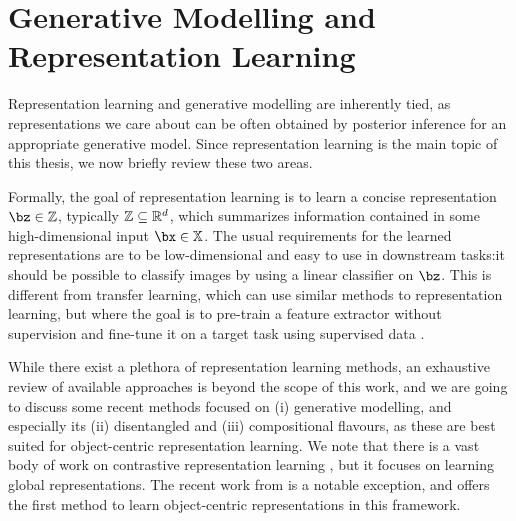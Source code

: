 \section{Generative Modelling and Representation Learning}
\label{sec:repr_learning}

Representation learning and generative modelling are inherently tied, as representations we care about can be often obtained by posterior inference for an appropriate generative model. 
Since representation learning is the main topic of this thesis, we now briefly review these two areas.

Formally, the goal of representation learning is to learn a concise representation $\bz \in \mathbb{Z}$, typically $\mathbb{Z} \subseteq \mathbb{R}^d$, which summarizes information contained in some high-dimensional input $\bx \in \mathbb{X}$.
The usual requirements for the learned representations are to be low-dimensional and easy to use in downstream tasks:\eg it should be possible to classify images by using a linear classifier on $\bz$.
This is different from transfer learning, which can use similar methods to representation learning, but where the goal is to pre-train a feature extractor without supervision and fine-tune it on a target task using supervised data \citep{He2019moco,Devlin2019bert}.

While there exist a plethora of representation learning methods, an exhaustive review of available approaches is beyond the scope of this work, and we are going to discuss some recent methods focused on 
(i) generative modelling, and especially its 
(ii) disentangled and
(iii) compositional flavours,
as these are best suited for object-centric representation learning.
We note that there is a vast body of work on contrastive representation learning \citep{Oord2016cond,Tschannen2019onmi,Hjelm2019deepinfomax,He2019moco,Schmidhuber1992pm}, but it focuses on learning global representations.
The recent work from \cite{Kipf2019cswm} is a notable exception, and offers the first method to learn object-centric representations in this framework.

